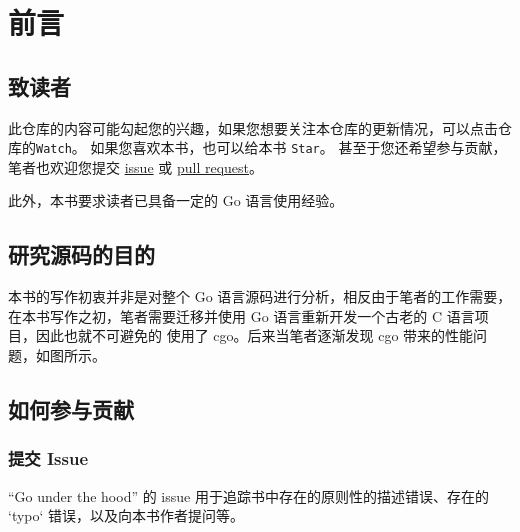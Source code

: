 \chapter*{前言}

\section*{致读者}

此仓库的内容可能勾起您的兴趣，如果您想要关注本仓库的更新情况，可以点击仓库的\texttt{Watch}。
如果您喜欢本书，也可以给本书 \texttt{Star}。
甚至于您还希望参与贡献，笔者也欢迎您提交 \href{https://github.com/changkun/go-under-the-hood/issues}{issue} 
或 \href{https://github.com/changkun/go-under-the-hood/pulls}{pull request}。

此外，本书要求读者已具备一定的 Go 语言使用经验。

\section*{研究源码的目的}

本书的写作初衷并非是对整个 Go 语言源码进行分析，相反由于笔者的工作需要，
在本书写作之初，笔者需要迁移并使用 Go 语言重新开发一个古老的 C 语言项目，因此也就不可避免的
使用了 cgo。后来当笔者逐渐发现 cgo 带来的性能问题，如图所示。

\section*{如何参与贡献}

\subsection*{提交 Issue}

``Go under the hood'' 的 issue 用于追踪书中存在的原则性的描述错误、存在的 `typo` 错误，以及向本书作者提问等。

